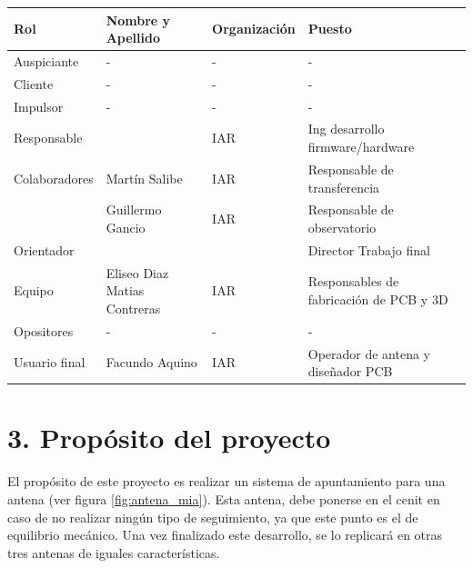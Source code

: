 \documentclass[11pt, %
codirector, %
]{charter}
\begin{document}
\begin{table}[ht]
\renewcommand {\arrayrulewidth}{1pt}
\begin{tabularx}{\linewidth}{@{}|l|X|X|l|@{}}
	\hline
	\rowcolor[HTML]{C0C0C0} 
	Rol           & Nombre y Apellido & Organización 	& Puesto 	\\ \hline
	Auspiciante   & -                 &  -             	& -        	\\ \hline
	Cliente       & -  			      &	 -				& -       	\\ \hline
	Impulsor      &  -                & -             	& -       	\\ \hline
	Responsable   & \authorname       & IAR        	    & Ing desarrollo firmware/hardware 	\\ \hline
	Colaboradores & Martín Salibe     & IAR             & Responsable de transferencia \\
				  &  Guillermo Gancio & IAR             & Responsable de observatorio \\ \hline
	Orientador    & \supname	      & \pertesupname 	& Director Trabajo final \\ \hline
	Equipo        & Eliseo Diaz \newline 
	Matias Contreras          & IAR              	& Responsables de fabricación de PCB y 3D  	\\ \hline
	Opositores    &  -                 & -             	& -        	\\ \hline
	Usuario final & Facundo Aquino     & IAR           	& Operador de antena  y diseñador PCB    	\\ \hline
\end{tabularx}
\end{table}




\section{3. Propósito del proyecto}
\label{sec:proposito}
	El propósito de este proyecto es realizar un sistema de apuntamiento para una antena (ver figura \ref{fig:antena_mia}). Esta antena, debe ponerse en el cenit en caso de no realizar ningún tipo de seguimiento, ya que este punto es el de equilibrio mecánico. Una vez finalizado este desarrollo, se lo replicará en otras tres antenas de iguales características. 
\end{document}
